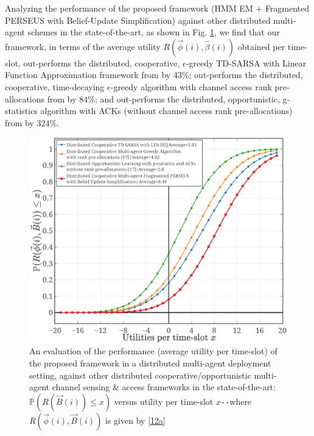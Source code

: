 \documentclass[10pt, twocolumn]{IEEEtran}
\begin{document}
Analyzing the performance of the proposed framework (HMM EM + Fragmented PERSEUS with Belief-Update Simplification) against other distributed multi-agent schemes in the state-of-the-art, as shown in Fig. \ref{fig: Z. 2}, we find that our framework, in terms of the average utility $R(\vec{\phi}(i), \hat{\beta}(i))$ obtained per time-slot, out-performs the distributed, cooperative, $\epsilon$-greedy TD-SARSA with Linear Function Approximation framework from \cite{WCL:5} by $43$\%; out-performs the distributed, cooperative, time-decaying $\epsilon$-greedy algorithm with channel access rank pre-allocations from \cite{WCL:MIT} by $84$\%; and out-performs the distributed, opportunistic, g-statistics algorithm with ACKs (without channel access rank pre-allocations) from \cite{WCL:MIT} by $324$\%.
\vspace{-5mm}
\begin{figure} [t]
    \centerline{
    \includegraphics[width=0.8\linewidth]{figures/Minerva_Multi_Agent_CDF_plot.png}}
    \vspace{-2mm}
    \caption{An evaluation of the performance (average utility per time-slot) of the proposed framework in a distributed multi-agent deployment setting, against other distributed cooperative/opportunistic multi-agent channel sensing \& access frameworks in the state-of-the-art: $\mathbb{P}(R(\vec{B}(i)){\leq}x)$ versus utility per time-slot $x$\texttt{-{}-}where $R(\vec{\phi}(i),\vec{B}(i))$ is given by \eqref{12a}}
    \vspace{-5mm}
    \label{fig: Z. 2}
\end{figure}
\end{document}
